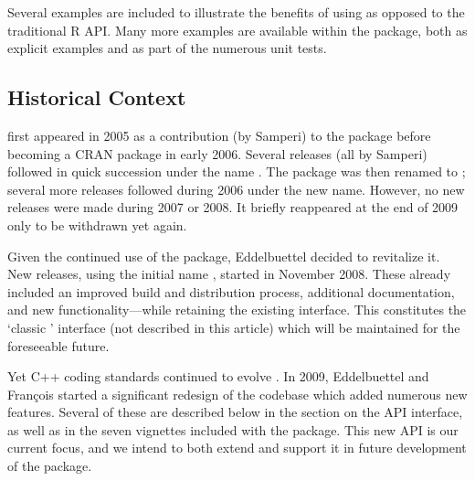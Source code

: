Several examples are included to illustrate the benefits of using 
as opposed to the traditional R API. Many more examples are available within
the package, both as explicit examples and as part of the numerous unit tests.

\subsection{Historical Context}

 first appeared in 2005 as a contribution (by Samperi) to the
 package \citep{cran:rquantlib} before becoming a CRAN package
in early 2006. Several releases (all by Samperi) followed in quick succession
under the name . The package was then renamed to
; several more releases followed during 2006 under the new
name.  However, no new releases were made during 2007 or 2008. It briefly
reappeared at the end of 2009 only to be withdrawn yet again. 

Given the continued use of the package, Eddelbuettel decided to revitalize it. New
releases, using the initial name , started in November 2008. These
already included an improved build and distribution process, additional
documentation, and new functionality---while retaining the existing
interface.  This constitutes the `classic ' interface 
(not described in this article) which will be maintained for the foreseeable future.

Yet C++ coding standards continued to evolve \citep{meyers:effectivecplusplus}.
In 2009, Eddelbuettel and Fran\c{c}ois started a significant redesign of the
codebase which added numerous new features.  Several of these are described
below in the section on the  API interface, as well as in the
seven vignettes included with the package. This new API is our current focus,
and we intend to both extend and support it in future development of the
package. 

